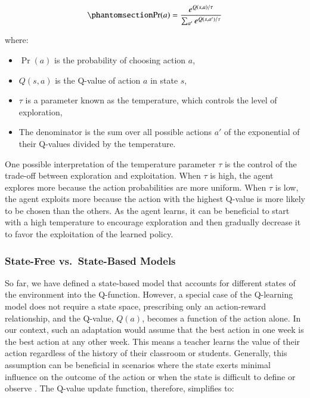 \documentclass[
  number,
  preprint,
  3p,
  onecolumn]{elsarticle}
\begin{document}
\begin{equation}\phantomsection\label{eq-softmax}{
\Pr(a) = \frac{e^{Q(s, a)/\tau}}{\sum_{a'} e^{Q(s, a')/\tau}}
}\end{equation}

where:

\begin{itemize}
\item
  \(\Pr(a)\) is the probability of choosing action \(a\),
\item
  \(Q(s, a)\) is the Q-value of action \(a\) in state \(s\),
\item
  \(\tau\) is a parameter known as the temperature, which controls the
  level of exploration,
\item
  The denominator is the sum over all possible actions \(a'\) of the
  exponential of their Q-values divided by the temperature.
\end{itemize}

One possible interpretation of the temperature parameter \(\tau\) is the
control of the trade-off between exploration and exploitation. When
\(\tau\) is high, the agent explores more because the action
probabilities are more uniform. When \(\tau\) is low, the agent exploits
more because the action with the highest Q-value is more likely to be
chosen than the others. As the agent learns, it can be beneficial to
start with a high temperature to encourage exploration and then
gradually decrease it to favor the exploitation of the learned policy.

\subsubsection{State-Free vs.~State-Based
Models}\label{state-free-vs.-state-based-models}

So far, we have defined a state-based model that accounts for different
states of the environment into the Q-function. However, a special case
of the Q-learning model does not require a state space, prescribing only
an action-reward relationship, and the Q-value, \(Q(a)\), becomes a
function of the action alone. In our context, such an adaptation would
assume that the best action in one week is the best action at any other
week. This means a teacher learns the value of their action regardless
of the history of their classroom or students. Generally, this
assumption can be beneficial in scenarios where the state exerts minimal
influence on the outcome of the action or when the state is difficult to
define or observe \citep{sutton2018}. The Q-value update function,
therefore, simplifies to:
\end{document}
